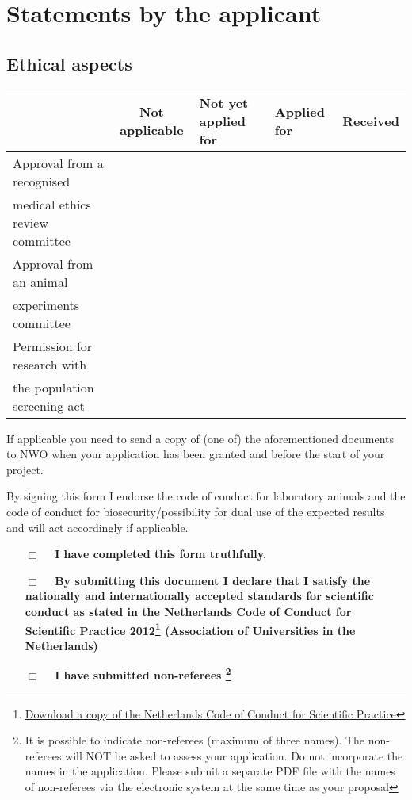 \section{Statements by the applicant}\label{sec:ethicalaspects}

\subsection*{Ethical aspects}

\newpage
\begin{table}[h!]
\begin{tabular}{p{14em}clll}
\hline
\T\B &Not applicable&Not yet applied for&Applied for&Received\\
\hline
\T Approval from a recognised&&&&\\
\B medical ethics review committee&&&&\\
\T Approval from an animal&&&&\\
\B experiments committee&&&&\\
\T Permission for research with&&&&\\
\B the population screening act&&&&\\
\hline
\end{tabular}
\end{table}

If applicable you need to send a copy of (one of) the aforementioned documents
to NWO when your application has been granted and before the start of your
project.

By signing this form I endorse the code of conduct for laboratory animals and
the code of conduct for biosecurity/possibility for dual use of the expected
results and will act accordingly if applicable.

\vspace{4em}

\begin{itemize}

\item[{\huge \text{\rlap{}}$\Box$}~~] \textbf{I have completed this form
truthfully.}

\item[{\huge \text{\rlap{}}$\Box$}~~] \textbf{By submitting this document I
declare that I satisfy the nationally and internationally accepted standards for
scientific conduct as stated in the Netherlands Code of Conduct for Scientific
Practice
2012\footnote{\href{http://www.vsnu.nl/files/documenten/Domeinen/Onderzoek/The\_Netherlands\_Code\_of\_Conduct\_for\_Scientific\_Practice\_2012.pdf}{Download
a copy of the Netherlands Code of Conduct for Scientific Practice}} (Association
of Universities in the Netherlands)}

\item[{\huge \text{\rlap{}}$\Box$}~~] \textbf{I have submitted non-referees
\footnote{It is possible to indicate non-referees (maximum of three names). The
non-referees will NOT be asked to assess your application. Do not incorporate
the names in the application. Please submit a separate PDF file with the names
of non-referees via the electronic system at the same time as your proposal}}

\end{itemize}

